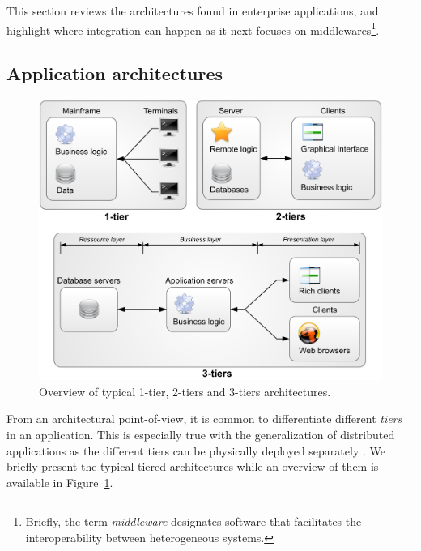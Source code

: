 This section reviews the architectures found in enterprise applications, and highlight where integration can happen as it next focuses on middlewares\footnote{Briefly, the term \emph{middleware} designates software that facilitates the interoperability between heterogeneous systems.}.


\subsection{Application architectures}


\begin{figure}[htbp]
    \centering
    \includegraphics[width=\textwidth]{content/web-services/123-tiers}
    \caption{Overview of typical 1-tier, 2-tiers and 3-tiers architectures.}
    \label{fig:123-tiers}
\end{figure}

From an architectural point-of-view, it is common to differentiate different \emph{tiers} in an application. This is especially true with the generalization of distributed applications as the different tiers can be physically deployed separately \cite{Alonso04}. We briefly present the typical tiered architectures while an overview of them is available in Figure~\ref{fig:123-tiers}.

